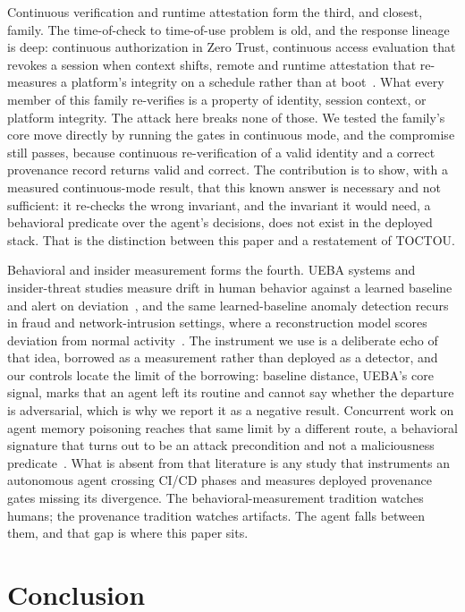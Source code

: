 \documentclass[conference]{IEEEtran}
\begin{document}
Continuous verification and runtime attestation form the third, and closest, family. The time-of-check to time-of-use problem is old, and the response lineage is deep: continuous authorization in Zero Trust, continuous access evaluation that revokes a session when context shifts, remote and runtime attestation that re-measures a platform's integrity on a schedule rather than at boot~\cite{contverif,attestationCoker,attestationKeylime}. What every member of this family re-verifies is a property of identity, session context, or platform integrity. The attack here breaks none of those. We tested the family's core move directly by running the gates in continuous mode, and the compromise still passes, because continuous re-verification of a valid identity and a correct provenance record returns valid and correct. The contribution is to show, with a measured continuous-mode result, that this known answer is necessary and not sufficient: it re-checks the wrong invariant, and the invariant it would need, a behavioral predicate over the agent's decisions, does not exist in the deployed stack. That is the distinction between this paper and a restatement of TOCTOU.

Behavioral and insider measurement forms the fourth. UEBA systems and insider-threat studies measure drift in human behavior against a learned baseline and alert on deviation~\cite{ueba}, and the same learned-baseline anomaly detection recurs in fraud and network-intrusion settings, where a reconstruction model scores deviation from normal activity~\cite{gahiFraud}. The instrument we use is a deliberate echo of that idea, borrowed as a measurement rather than deployed as a detector, and our controls locate the limit of the borrowing: baseline distance, UEBA's core signal, marks that an agent left its routine and cannot say whether the departure is adversarial, which is why we report it as a negative result. Concurrent work on agent memory poisoning reaches that same limit by a different route, a behavioral signature that turns out to be an attack precondition and not a maliciousness predicate~\cite{forensicsig}. What is absent from that literature is any study that instruments an autonomous agent crossing CI/CD phases and measures deployed provenance gates missing its divergence. The behavioral-measurement tradition watches humans; the provenance tradition watches artifacts. The agent falls between them, and that gap is where this paper sits.

\section{Conclusion}\label{sec:conclusion}
\end{document}

